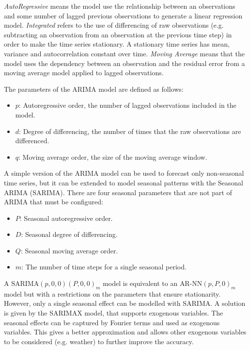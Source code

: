 \emph{AutoRegressive} means the model use the relationship between an observations and some number of lagged previous observations to generate a linear regression model. \emph{Integrated} refers to the use of differencing of raw observations (e.g. subtracting an observation from an observation at the previous time step) in order to make the time series stationary. A stationary time series has mean, variance and autocorrelation constant over time. \emph{Moving Average} means that the model uses the dependency between an observation and the residual error from a moving average model applied to lagged observations.

The parameters of the ARIMA model are defined as follows:
\begin{itemize}
  \item \( p \): Autoregressive order, the number of lagged observations included in the model.
  \item \( d \): Degree of differencing, the number of times that the raw observations are differenced.
  \item \( q \): Moving average order, the size of the moving average window.
\end{itemize}

A simple version of the ARIMA model can be used to forecast only non-seasonal time series, but it can be extended to model seasonal patterns with the Seasonal ARIMA (SARIMA). There are four seasonal parameters that are not part of ARIMA that must be configured:
\begin{itemize}
  \item \( P \): Seasonal autoregressive order.
  \item \( D \): Seasonal degree of differencing.
  \item \( Q \): Seasonal moving average order.
  \item \( m \): The number of time steps for a single seasonal period.
\end{itemize}
A \( \text{SARIMA}(p,0,0)(P,0,0)_m \) model is equivalent to an \( \text{AR-NN}(p,P,0)_m \) model but with a restrictions on the parameters that ensure stationarity.
However, only a single seasonal effect can be modelled with SARIMA. A solution is given by the SARIMAX model, that supports exogenous variables. The seasonal effects can be captured by Fourier terms and used as exogenous variables. This gives a better approximation and allows other exogenous variables to be considered (e.g. weather) to further improve the accuracy.

